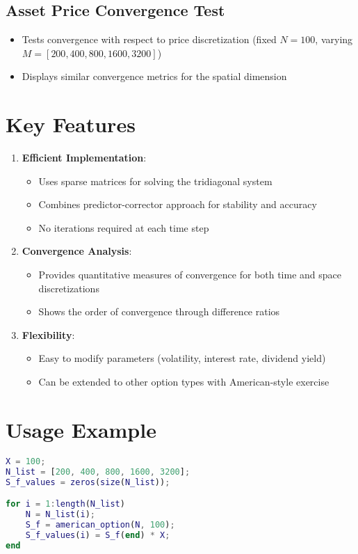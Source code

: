 \documentclass[12pt]{article}
\begin{document}
\subsection*{Asset Price Convergence Test}
\begin{itemize}
  \item Tests convergence with respect to price discretization (fixed $N=100$, varying $M = [200, 400, 800, 1600, 3200]$)
  \item Displays similar convergence metrics for the spatial dimension
\end{itemize}

\section*{Key Features}
\begin{enumerate}
  \item \textbf{Efficient Implementation}:
  \begin{itemize}
    \item Uses sparse matrices for solving the tridiagonal system
    \item Combines predictor-corrector approach for stability and accuracy
    \item No iterations required at each time step
  \end{itemize}
  \item \textbf{Convergence Analysis}:
  \begin{itemize}
    \item Provides quantitative measures of convergence for both time and space discretizations
    \item Shows the order of convergence through difference ratios
  \end{itemize}
  \item \textbf{Flexibility}:
  \begin{itemize}
    \item Easy to modify parameters (volatility, interest rate, dividend yield)
    \item Can be extended to other option types with American-style exercise
  \end{itemize}
\end{enumerate}

\section*{Usage Example}
\begin{lstlisting}[language=Matlab]
% Run convergence tests
X = 100;
N_list = [200, 400, 800, 1600, 3200];
S_f_values = zeros(size(N_list));

for i = 1:length(N_list)
    N = N_list(i);
    S_f = american_option(N, 100); 
    S_f_values(i) = S_f(end) * X; 
end
\end{lstlisting}
\end{document}
